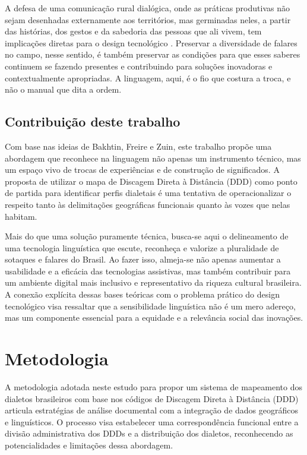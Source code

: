 A defesa de uma comunicação rural dialógica, onde as práticas produtivas não sejam desenhadas externamente aos territórios, mas germinadas neles, a partir das histórias, dos gestos e da sabedoria das pessoas que ali vivem, tem implicações diretas para o design tecnológico \cite{zuin2021comunicacao}. Preservar a diversidade de falares no campo, nesse sentido, é também preservar as condições para que esses saberes continuem se fazendo presentes e contribuindo para soluções inovadoras e contextualmente apropriadas. A linguagem, aqui, é o fio que costura a troca, e não o manual que dita a ordem.



\section{Contribuição deste trabalho}

Com base nas ideias de Bakhtin, Freire e Zuin, este trabalho propõe uma abordagem que reconhece na linguagem não apenas um instrumento técnico, mas um espaço vivo de trocas de experiências e de construção de significados. A proposta de utilizar o mapa de Discagem Direta à Distância (DDD) como ponto de partida para identificar perfis dialetais é uma tentativa de operacionalizar o respeito tanto às delimitações geográficas funcionais quanto às vozes que nelas habitam.

Mais do que uma solução puramente técnica, busca-se aqui o delineamento de uma tecnologia linguística que escute, reconheça e valorize a pluralidade de sotaques e falares do Brasil. Ao fazer isso, almeja-se não apenas aumentar a usabilidade e a eficácia das tecnologias assistivas, mas também contribuir para um ambiente digital mais inclusivo e representativo da riqueza cultural brasileira. A conexão explícita dessas bases teóricas com o problema prático do design tecnológico visa ressaltar que a sensibilidade linguística não é um mero adereço, mas um componente essencial para a equidade e a relevância social das inovações.











\chapter{Metodologia}


A metodologia adotada neste estudo para propor um sistema de mapeamento dos dialetos brasileiros com base nos códigos de Discagem Direta à Distância (DDD) articula estratégias de análise documental com a integração de dados geográficos e linguísticos. O processo visa estabelecer uma correspondência funcional entre a divisão administrativa dos DDDs e a distribuição dos dialetos, reconhecendo as potencialidades e limitações dessa abordagem.





